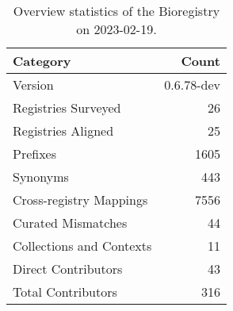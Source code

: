\begin{table}
\centering
\caption{Overview statistics of the Bioregistry on 2023-02-19.}
\label{tab:bioregistry-summary}
\begin{tabular}{lr}
\toprule
                Category &      Count \\
\midrule
                 Version & 0.6.78-dev \\
     Registries Surveyed &         26 \\
      Registries Aligned &         25 \\
                Prefixes &       1605 \\
                Synonyms &        443 \\
 Cross-registry Mappings &       7556 \\
      Curated Mismatches &         44 \\
Collections and Contexts &         11 \\
     Direct Contributors &         43 \\
      Total Contributors &        316 \\
\bottomrule
\end{tabular}
\end{table}
